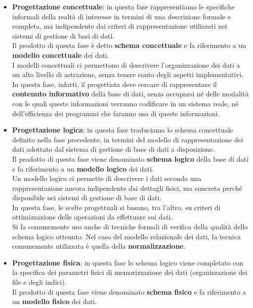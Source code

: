     \begin{itemize}
        \item{\textbf{Progettazione concettuale}: in questa fase rappresentiamo le specifiche informali della realtà di interesse in termini di una descrizione formale e completa, ma indipendente dai criteri di rappresentazione utilizzati nei sistemi di gestione di basi di dati.\\
        Il prodotto di questa fase è detto \textbf{schema concettuale} e fa riferimento a un \textbf{modello concettuale} dei dati.\\
        I modelli concettuali ci permettono di descrivere l'organizzazione dei dati a un alto livello di astrazione, senza tenere conto degli aspetti implementativi.\\
        In questa fase, infatti, il progettista deve cercare di rappresentare il \textbf{contenuto informativo} della base di dati, senza occuparsi né delle modalità con le quali queste informazioni verranno codificare in un sistema reale, né dell'efficienza dei programmi che faranno uso di queste informazioni.}
        \item{\textbf{Progettazione logica}: in questa fase traduciamo lo schema concettuale definito nella fase precedente, in termini del modello di rappresentazione dei dati adottato dal sistema di gestione di base di dati a disposizione.\\
        Il prodotto di questa fase viene denominato \textbf{schema logico} della base di dati e fa riferimento a un \textbf{modello logico} dei dati.\\
        Un modello logico ci permette di descrivere i dati secondo una rappresentazione ancora indipendente dai dettagli fisici, ma concreta perché disponibile nei sistemi di gestione di base di dati.\\
        In questa fase, le scelte progettuali si basano, tra l'altro, su criteri di ottimizzazione delle operazioni da effettuare sui dati.\\
        Si fa comunemente uso anche di tecniche formali di verifica della qualità dello schema logico ottenuto. Nel caso del modello relazionale dei dati, la tecnica comunemente utilizzata è quella della \textbf{normalizzazione}.}
        \item{\textbf{Progettazione fisica}: in questa fase lo schema logico viene completato con la specifica dei parametri fisici di memorizzazione dei dati (organizzazione dei file e degli indici).\\
        Il prodotto di questa fase viene denominato \textbf{schema fisico} e fa riferimento a un \textbf{modello fisico} dei dati.}
    \end{itemize}

